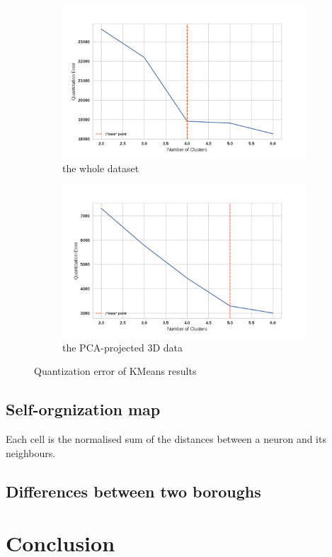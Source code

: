 \documentclass[12pt]{article}
\begin{document}
\begin{figure}
    \centering
    \begin{subfigure}[b]{0.47\textwidth}
        \includegraphics[width=\textwidth]{images/cluster-err1.png}
        \caption{the whole dataset}
        \label{fig:cluster-err1}
    \end{subfigure}
    \begin{subfigure}[b]{0.47\textwidth}
        \includegraphics[width=\textwidth]{images/cluster-err2.png}
        \caption{the PCA-projected 3D data}
        \label{fig:cluster-err2}
    \end{subfigure}
    \label{fig:cluster-err}
    \caption{Quantization error of KMeans results}
\end{figure} 
\subsection{Self-orgnization map}


Each cell is the normalised sum of the distances between a neuron and its neighbours.

\subsection{Differences between two boroughs}
\section{Conclusion}

\newpage

\end{document}
